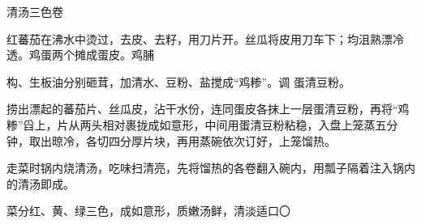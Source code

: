\begin{recipe}[三色如意卷]{清汤三色卷}

\ingredients


\cooking

\step 红蕃茄在沸水中烫过，去皮、去籽，用刀片开。丝瓜将皮用刀车下；均沮熟漂冷透。鸡蛋两个摊成蛋皮。鸡脯

构、生板油分别砸茸，加清水、豆粉、盐搅成“鸡糁”。调 蛋清豆粉。

\step 捞出漂起的蕃茄片、丝瓜皮，沾干水份，连同蛋皮各抹上一层蛋清豆粉，再将“鸡糁”舀上，片从两头相对裹拢成如意形，中间用蛋清豆粉粘稳，入盘上笼蒸五分钟，取出晾冷，各切四分厚片块，再用蒸碗依次订好，上笼馏热。

\step 走菜时锅内烧清汤，吃味扫清亮，先将馏热的各卷翻入碗内，用瓢子隔着注入锅内的清汤即成。

\notes

菜分红、黄、绿三色，成如意形，质嫩汤鲜，清淡适口〇

\end{recipe}


